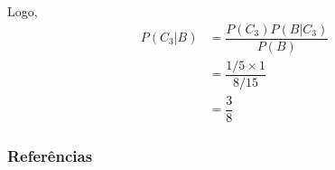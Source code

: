 \documentclass[14pt,aspectratio=1610]{beamer}
\begin{document}
\begin{frame}{}
\frametitle{}
\begin{block}{}
\justifying
Logo, 
\begin{align}
P(C_{3}|B)&=\dfrac{P(C_{3})P(B|C_{3})}{P(B)}\\
&=\dfrac{1/5 \times 1}{8/15}\\
&=\dfrac{3}{8}
\end{align}
\nocite{roteiro}
\end{block}
\nocite{Morettin09, Apostila, eric, montgomery2016, meyer1982probabilidade, Bastos2025}
\end{frame}

\begin{frame}[allowframebreaks]
\frametitle{\bf Referências}
\printbibliography
\end{frame}
\end{document}
